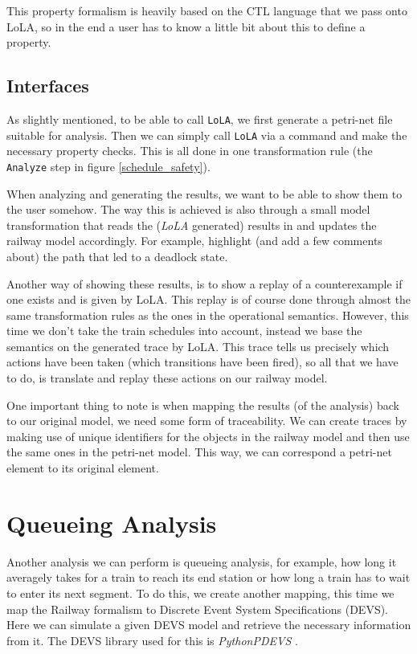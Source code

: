 \documentclass{article}
\begin{document}
This property formalism is heavily based on the CTL language that we pass onto LoLA, so in the end a user has to know a little bit about this to define a property.

\subsection{Interfaces}
\label{safety_interfaces}

As slightly mentioned, to be able to call \texttt{LoLA}, we first generate a petri-net file suitable for analysis. Then we can simply call \texttt{LoLA} via a command and make the necessary property checks. This is all done in one transformation rule (the \texttt{Analyze} step in figure \ref{schedule_safety}).

When analyzing and generating the results, we want to be able to show them to the user somehow. The way this is achieved is also through a small model transformation that reads the (\textit{LoLA} generated) results in and updates the railway model accordingly. For example, highlight (and add a few comments about) the path that led to a deadlock state.

Another way of showing these results, is to show a replay of a counterexample if one exists and is given by LoLA. This replay is of course done through almost the same transformation rules as the ones in the operational semantics. However, this time we don't take the train schedules into account, instead we base the semantics on the generated trace by LoLA. This trace tells us precisely which actions have been taken (which transitions have been fired), so all that we have to do, is translate and replay these actions on our railway model. 

One important thing to note is when mapping the results (of the analysis) back to our original model, we need some form of traceability. We can create traces by making use of unique identifiers for the objects in the railway model and then use the same ones in the petri-net model. This way, we can correspond a petri-net element to its original element.


\section{Queueing Analysis}

Another analysis we can perform is queueing analysis, for example, how long it averagely takes for a train to reach its end station or how long a train has to wait to enter its next segment. To do this, we create another mapping, this time we map the Railway formalism to Discrete Event System Specifications (DEVS). Here we can simulate a given DEVS model and retrieve the necessary information from it. The DEVS library used for this is \textit{PythonPDEVS} \cite{pythonpdevs}.
\end{document}
